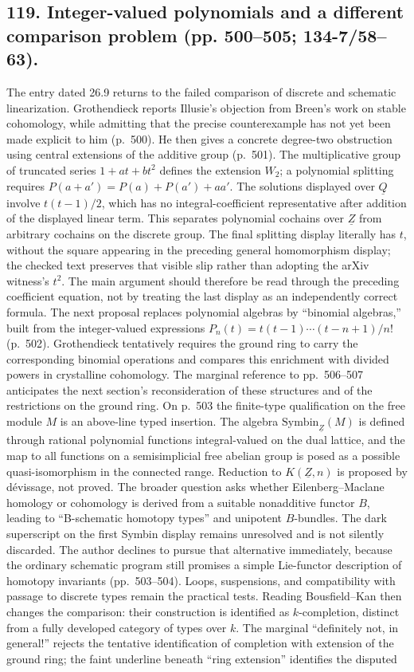 \documentclass[10pt,oneside]{book}
\begin{document}
\subsection*{119. Integer-valued polynomials and a different comparison problem (pp. 500--505; 134-7/58--63).}
The entry dated 26.9 returns to the failed comparison of discrete and schematic linearization. Grothendieck reports Illusie's objection from Breen's work on stable cohomology, while admitting that the precise counterexample has not yet been made explicit to him (p.~500). He then gives a concrete degree-two obstruction using central extensions of the additive group (p.~501). The multiplicative group of truncated series $1+at+bt^2$ defines the extension $W_2$; a polynomial splitting requires $P(a+a')=P(a)+P(a')+aa'$. The solutions displayed over $\underline Q$ involve $t(t-1)/2$, which has no integral-coefficient representative after addition of the displayed linear term. This separates polynomial cochains over $\underline Z$ from arbitrary cochains on the discrete group. The final splitting display literally has $t$, without the square appearing in the preceding general homomorphism display; the checked text preserves that visible slip rather than adopting the arXiv witness's $t^2$. The main argument should therefore be read through the preceding coefficient equation, not by treating the last display as an independently correct formula. The next proposal replaces polynomial algebras by ``binomial algebras,'' built from the integer-valued expressions $P_n(t)=t(t-1)\cdots(t-n+1)/n!$ (p.~502). Grothendieck tentatively requires the ground ring to carry the corresponding binomial operations and compares this enrichment with divided powers in crystalline cohomology. The marginal reference to pp.~506--507 anticipates the next section's reconsideration of these structures and of the restrictions on the ground ring. On p.~503 the finite-type qualification on the free module $M$ is an above-line typed insertion. The algebra $\mathrm{Symbin}_{\underline Z}(M)$ is defined through rational polynomial functions integral-valued on the dual lattice, and the map to all functions on a semisimplicial free abelian group is posed as a possible quasi-isomorphism in the connected range. Reduction to $K(\underline Z,n)$ is proposed by d\'evissage, not proved. The broader question asks whether Eilenberg--Maclane homology or cohomology is derived from a suitable nonadditive functor $B$, leading to ``B-schematic homotopy types'' and unipotent $B$-bundles. The dark superscript on the first Symbin display remains unresolved and is not silently discarded. The author declines to pursue that alternative immediately, because the ordinary schematic program still promises a simple Lie-functor description of homotopy invariants (pp.~503--504). Loops, suspensions, and compatibility with passage to discrete types remain the practical tests. Reading Bousfield--Kan then changes the comparison: their construction is identified as $k$-completion, distinct from a fully developed category of types over $k$. The marginal ``definitely not, in general!'' rejects the tentative identification of completion with extension of the ground ring; the faint underline beneath ``ring extension'' identifies the disputed 
\end{document}
